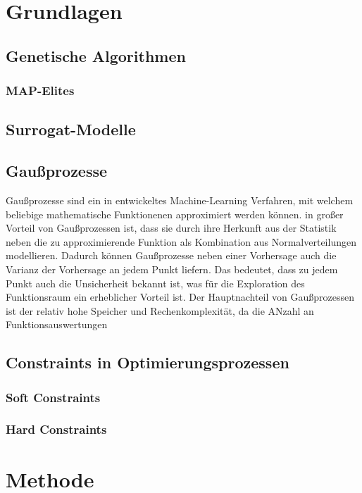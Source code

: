 \section{Grundlagen}

\subsection{Genetische Algorithmen}

\subsubsection{MAP-Elites}

\subsection{Surrogat-Modelle}

\subsection{Gaußprozesse}

Gaußprozesse sind ein in  entwickeltes Machine-Learning Verfahren, mit welchem beliebige mathematische Funktionenen approximiert werden können. in großer Vorteil von Gaußprozessen ist, dass sie durch ihre Herkunft aus der Statistik neben die zu approximierende Funktion als Kombination aus Normalverteilungen modellieren.
Dadurch können Gaußprozesse neben einer Vorhersage auch die Varianz der Vorhersage an jedem Punkt liefern.
Das bedeutet, dass zu jedem Punkt auch die Unsicherheit bekannt ist, was für die Exploration des Funktionsraum
ein erheblicher Vorteil ist.
Der Hauptnachteil von Gaußprozessen ist der relativ hohe Speicher und Rechenkomplexität, da die ANzahl an Funktionsauswertungen 
\subsection{Constraints in Optimierungsprozessen}

\subsubsection{Soft Constraints}

\subsubsection{Hard Constraints}

\section{Methode}

